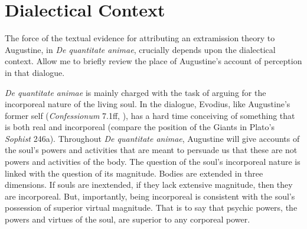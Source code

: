 \documentclass[12pt]{article}
\begin{document}
 


\section{Dialectical Context} %
\label{sec:dialectical_context}

The force of the textual evidence for attributing an extramission theory to Augustine, in \emph{De quantitate animae}, crucially depends upon the dialectical context. Allow me to briefly review the place of Augustine's account of perception in that dialogue.

\emph{De quantitate animae}  is mainly charged with the task of arguing for the incorporeal nature of the living soul. In the dialogue, Evodius, like Augustine’s former self (\emph{Confessionum} 7.1ff, \citealt{Migne:1845aa}), has a hard time conceiving of something that is both real and incorporeal (compare the position of the Giants in Plato's \emph{Sophist} 246a). Throughout \emph{De quantitate animae}, Augustine will give accounts of the soul’s powers and activities that are meant to persuade us that these are not powers and activities of the body. The question of the soul’s incorporeal nature is linked with the question of its magnitude. Bodies are extended in three dimensions. If souls are inextended, if they lack extensive magnitude, then they are incorporeal. But, importantly, being incorporeal is consistent with the soul’s possession of superior virtual magnitude. That is to say that psychic powers, the powers and virtues of the soul, are superior to any corporeal power. 
\end{document}
